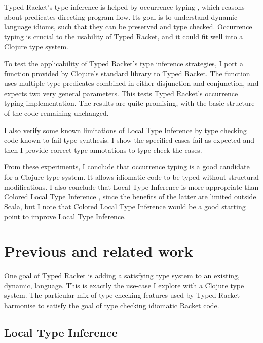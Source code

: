 \documentclass[12pt,a4paper]{article}
\begin{document}
Typed Racket's type inference is helped by occurrence typing \cite{Tobin-Hochstadt:2010:LTU:1932681.1863561}
, which reasons about predicates directing program flow. Its
goal is to understand dynamic language idioms, such that they can
be preserved and type checked. Occurrence typing is crucial to the
usability of Typed Racket, and it could fit well into a Clojure
type system.

To test the applicability of Typed Racket's type inference strategies,
I port a function provided by Clojure's standard library
to Typed Racket. The function uses multiple type predicates
combined in either disjunction and conjunction, and expects two very general
parameters. This tests Typed Racket's occurrence typing implementation.
The results are quite promising, with the basic structure of the code remaining unchanged.

I also verify some known limitations of Local Type Inference 
\cite{Pierce:2000:LTI:345099.345100}\cite{Hosoya99howgood}
by type checking code known to fail type synthesis. I show the specified cases fail as expected
and then I provide correct type annotations to type check the cases.

From these experiments, I conclude that occurrence typing is
a good candidate for a Clojure type system. It allows idiomatic code to be
typed without structural modifications. I also conclude that Local Type Inference 
\cite{Pierce:2000:LTI:345099.345100}
is more appropriate than Colored Local Type Inference \cite{Odersky:2001:CLT:373243.360207}, since the benefits of the
latter are limited outside Scala, but I note that Colored Local Type Inference
would be a good starting point to improve Local Type Inference.

\section{Previous and related work}

One goal of Typed Racket \cite{Tobin-Hochstadt:2008:DIT:1328897.1328486} is 
adding a satisfying type system to an existing, dynamic, 
language. This is exactly the use-case I explore with a Clojure type system.
The particular mix of type checking features used by Typed Racket harmonise to satisfy the 
goal of type checking idiomatic Racket code.

\subsection{Local Type Inference}
\end{document}
